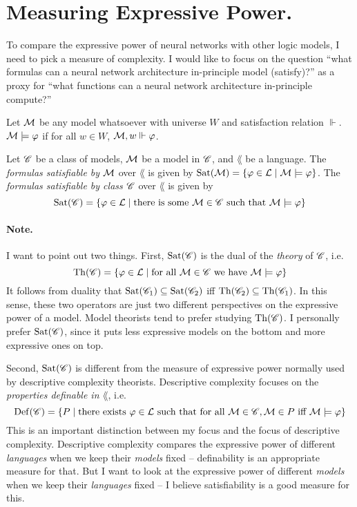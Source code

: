 \documentclass[letterpaper]{article}
\begin{document}
\section*{Measuring Expressive Power.} 

To compare the expressive power of neural networks with other logic models, I need to pick a measure of complexity.  I would like to focus on the question ``what formulas can a neural network architecture in-principle model (satisfy)?'' as a proxy for ``what functions can a neural network architecture in-principle compute?''

\begin{definition}
    Let $\mathcal{M}$ be any model whatsoever with universe $W$ and satisfaction relation $\Vdash$.  $\mathcal{M} \models \varphi$ if for all $w \in W$, $\mathcal{M}, w \Vdash \varphi$.
\end{definition}

\begin{definition}
    Let $\mathscr{C}$ be a class of models, $\mathcal{M}$ be a model in $\mathscr{C}$, and $\lang$ be a language.  The \emph{formulas satisfiable by} $\mathcal{M}$ over $\lang$ is given by $\mathrm{Sat}( \mathcal{M} ) = \{ \varphi \in \mathcal{L} \mid \mathcal{M} \models \varphi \}$.  The \emph{formulas satisfiable by class $\mathscr{C}$} over $\lang$ is given by 
    \[
        \mathrm{Sat}( \mathscr{C} ) = \{ \varphi \in \mathcal{L} \mid \textrm{there is some } \mathcal{M} \in \mathscr{C} \textrm{ such that } \mathcal{M} \models \varphi \}
    \]
\end{definition}

\paragraph*{Note.}  I want to point out two things.  First, $\mathrm{Sat}( \mathscr{C} )$ is the dual of the \emph{theory} of $\mathscr{C}$, i.e.
\[
    \mathrm{Th}( \mathscr{C} ) = \{ \varphi \in \mathcal{L} \mid \textrm{for all } \mathcal{M} \in \mathscr{C} \textrm{ we have } \mathcal{M} \models \varphi \}
\]
It follows from duality that $\mathrm{Sat}( \mathscr{C}_1 ) \subseteq \mathrm{Sat}( \mathscr{C}_2 )$ iff $\mathrm{Th}( \mathscr{C}_2 ) \subseteq \mathrm{Th}( \mathscr{C}_1 )$.  In this sense, these two operators are just two different perspectives on the expressive power of a model.  Model theorists tend to prefer studying $\mathrm{Th}( \mathscr{C} )$.  I personally prefer $\mathrm{Sat}( \mathscr{C} )$, since it puts less expressive models on the bottom and more expressive ones on top.

Second, $\mathrm{Sat}( \mathscr{C} )$ is different from the measure of expressive power normally used by descriptive complexity theorists.  Descriptive complexity focuses on the \emph{properties definable in $\lang$}, i.e.
\[
    \mathrm{Def}( \mathscr{C} ) = \{ P \mid \textrm{there exists } \varphi \in \mathcal{L} \textrm{ such that for all } \mathcal{M} \in \mathscr{C}, \mathcal{M} \in P \textrm{ iff } \mathcal{M} \models \varphi \}
\]
This is an important distinction between my focus and the focus of descriptive complexity.  Descriptive complexity compares the expressive power of different \emph{languages} when we keep their \emph{models} fixed -- definability is an appropriate measure for that.  But I want to look at the expressive power of different \emph{models} when we keep their \emph{languages} fixed -- I believe satisfiability is a good measure for this.
\end{document}
